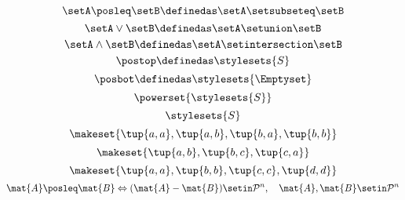 {\begin{forslides}
    \begin{equation}
        \label{eq:pow_1}
        \setA \posleq \setB \definedas \setA \setsubseteq \setB
    \end{equation}
    \begin{equation}
        \label{eq:pow_2}
        \setA \vee \setB \definedas \setA \setunion \setB
    \end{equation}
    \begin{equation}
        \label{eq:pow_3}
        \setA \wedge \setB \definedas \setA \setintersection \setB
    \end{equation}
    \begin{equation}
        \label{eq:pow_4}
        \postop \definedas \stylesets{S}
    \end{equation}
    \begin{equation}
        \label{eq:pow_5}
        \posbot \definedas \stylesets{\Emptyset}
    \end{equation}
    \begin{equation}
        \label{eq:pow_6}
        \powerset{\stylesets{S}}
    \end{equation}
    \begin{equation}
        \label{eq:pow_7}
        \stylesets{S}
    \end{equation}
    \begin{equation}
        \label{eq:pre_ex1}
        \makeset{\tup{a,a}, \tup{a,b}, \tup{b,a}, \tup{b,b}}
    \end{equation}
    \begin{equation}
        \label{eq:pre_ex2}
        \makeset{\tup{a,b}, \tup{b,c}, \tup{c,a}}
    \end{equation}
    \begin{equation}
        \label{eq:pre_ex3}
        \makeset{\tup{a,a}, \tup{b,b}, \tup{c,c}, \tup{d,d}}
    \end{equation}
    \begin{equation}
        \label{eq:posdef_1}
        \mat{A}\posleq \mat{B} \Leftrightarrow (\mat{A}-\mat{B})\setin \mathcal{P}^n, \quad \mat{A},\mat{B}\setin \mathcal{P}^n
    \end{equation}

\end{forslides}

}